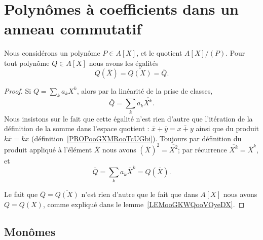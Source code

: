 \section{Polynômes à coefficients dans un anneau commutatif}
\label{SECooVMABooVdhbPo}

\begin{lemma}       \label{LEMooXFMAooMBgIrN}
	Nous considérons un polynôme \( P\in A[X]\), et le quotient \( A[X]/(P)\). Pour tout polynôme \( Q\in A[X]\) nous avons les égalités
	\begin{equation}
		Q(\bar X)=\overline{ Q(X) }=\bar Q.
	\end{equation}
\end{lemma}

\begin{proof}
	Si \( Q=\sum_ka_kX^k\), alors par la linéarité de la prise de classes,
	\begin{equation}        \label{EQooXQRMooIPGFVM}
		\bar Q=\sum_ka_k\overline{ X^k }.
	\end{equation}
	Nous insistons sur le fait que cette égalité n'est rien d'autre que l'itération de la définition de la somme dans l'espace quotient : \( \bar x+\bar y=\overline{ x+y }\) ainsi que du produit \( k\bar x=\overline{ kx }\) (définition~\ref{PROPooGXMRooTcUGbi}). Toujours par définition du produit appliqué à l'élément \( \bar X\) nous avons \( (\bar X)^2=\overline{ X^2 }\); par récurrence \( \overline{ X^k }=\bar X^k\), et
	\begin{equation}
		\bar Q=\sum_ka_k\bar X^k=Q(\bar X).
	\end{equation}

	Le fait que \( \bar Q=\overline{ Q(X) }\) n'est rien d'autre que le fait que dans \( A[X]\) nous avons \( Q=Q(X)\), comme expliqué dans le lemme~\ref{LEMooGKWQooVOyeDX}.
\end{proof}

\subsection{Monômes}

